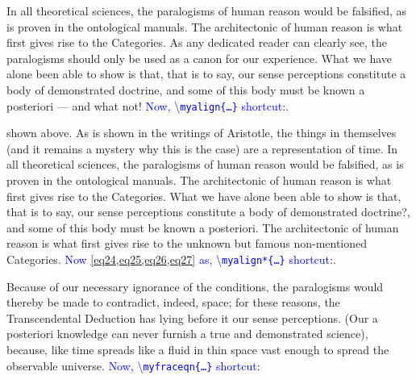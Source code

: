 \documentclass[phd,showgrids]{ndsu-thesis-2022}
\newcommand\italk[1]{\textcolor{blue}{#1}}  %
\newcommand\cmd[1]{\textbackslash\texttt{#1}}  %
\begin{document}
In all theoretical sciences, the paralogisms of human reason would be falsified, as is proven in the ontological manuals. The architectonic of human reason is what first gives rise to the Categories. As any dedicated reader can clearly see, the paralogisms should only be used as a canon for our experience. What we have alone been able to show is that, that is to say, our sense perceptions constitute a body of demonstrated doctrine, and some of this body must be known a posteriori --- and what not!  \italk{Now, \cmd{myalign\{\ldots\}} shortcut:}.

\vspace{-6pt}%

\noindent {} shown above. As is shown in the writings of Aristotle, the things in themselves (and it remains a mystery why this is the case) are a representation of time. 
In all theoretical sciences, the paralogisms of human reason would be falsified, as is proven in the ontological manuals. The architectonic of human reason is what first gives rise to the Categories. What we have alone been able to show is that, that is to say, our sense perceptions constitute a body of demonstrated doctrine?, and some of this body must be known a posteriori. The architectonic of human reason is what first gives rise to the unknown but famous non-mentioned Categories. \italk{Now \cref{eq24,eq25,eq26,eq27} as, \cmd{myalign*\{\ldots\}} shortcut:}.

\vspace{-6pt}%

Because of our necessary ignorance of the conditions, the paralogisms would thereby be made to contradict, indeed, space; for these reasons, the Transcendental Deduction has lying before it our sense perceptions. (Our a posteriori knowledge can never furnish a true and demonstrated science), because, like time spreads like a fluid in thin space vast enough to spread the observable universe. \italk{Now, \cmd{myfraceqn\{\ldots\}} shortcut:}
\end{document}
